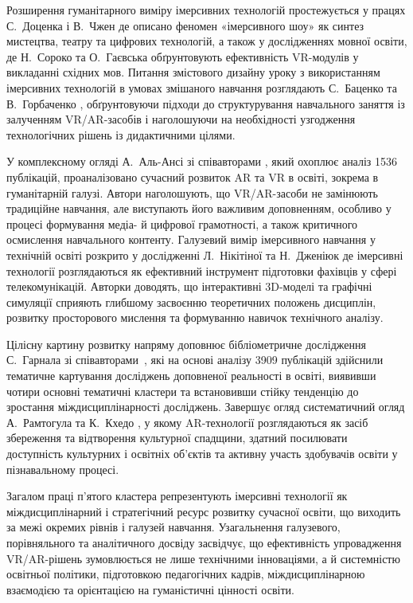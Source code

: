 Розширення гуманітарного виміру імерсивних технологій простежується у працях С.~Доценка і В.~Чжен \cite{Dotsenko2023Immersive} де описано феномен «імерсивного шоу» як синтез мистецтва, театру та цифрових технологій, а також у дослідженнях мовної освіти, де Н.~Сороко та О.~Гаєвська \cite{Soroko2021Eastern} обґрунтовують ефективність VR-модулів у викладанні східних мов. Питання змістового дизайну уроку з використанням імерсивних технологій в умовах змішаного навчання розглядають С.~Баценко та В.~Горбаченко \cite{Batsenko2025Blended}, обґрунтовуючи підходи до структурування навчального заняття із залученням VR/AR-засобів і наголошуючи на необхідності узгодження технологічних рішень із дидактичними цілями.

У комплексному огляді А.~Аль-Ансі зі співавторами \cite{Sabodashko2024Humanities}, який охоплює аналіз 1536 публікацій, проаналізовано сучасний розвиток AR та VR в освіті, зокрема в гуманітарній галузі. Автори наголошують, що VR/AR-засоби не замінюють традиційне навчання, але виступають його важливим доповненням, особливо у процесі формування медіа- й цифрової грамотності, а також критичного осмислення навчального контенту. Галузевий вимір імерсивного навчання у технічній освіті розкрито у дослідженні Л.~Нікітіної та Н.~Дженіюк \cite{Nikitina2023Telecom} де імерсивні технології розглядаються як ефективний інструмент підготовки фахівців у сфері телекомунікацій. Авторки доводять, що інтерактивні 3D-моделі та графічні симуляції сприяють глибшому засвоєнню теоретичних положень дисциплін, розвитку просторового мислення та формуванню навичок технічного аналізу.

Цілісну картину розвитку напряму доповнює бібліометричне дослідження С.~Гарнала зі співавторами~\cite{Harnal2023Bibliometric}, які на основі аналізу 3909 публікацій здійснили тематичне картування досліджень доповненої реальності в освіті, виявивши чотири основні тематичні кластери та встановивши стійку тенденцію до зростання міждисциплінарності досліджень. Завершує огляд систематичний огляд А.~Рамтогула та К.~Кхедо \cite{Granchak2023Heritage}, у якому AR-технології розглядаються як засіб збереження та відтворення культурної спадщини, здатний посилювати доступність культурних і освітніх об'єктів та активну участь здобувачів освіти у пізнавальному процесі.

Загалом праці п'ятого кластера репрезентують імерсивні технології як міждисциплінарний і стратегічний ресурс розвитку сучасної освіти, що виходить за межі окремих рівнів і галузей навчання. Узагальнення галузевого, порівняльного та аналітичного досвіду засвідчує, що ефективність упровадження VR/AR-рішень зумовлюється не лише технічними інноваціями, а й системністю освітньої політики, підготовкою педагогічних кадрів, міждисциплінарною взаємодією та орієнтацією на гуманістичні цінності освіти.

